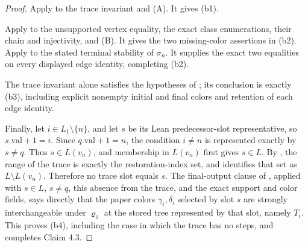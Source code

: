\begin{proof}
Apply  to the trace invariant and
(A).  It gives (b1).

Apply  to the unsupported
vertex equality, the exact class enumerations, their chain and
injectivity, and (B).  It gives the two missing-color assertions in
(b2).  Apply  to the stated
terminal stability of \(\sigma_n\).  It supplies the exact two
equalities on every displayed edge identity, completing (b2).

The trace invariant alone satisfies the hypotheses of
; its conclusion is exactly
(b3), including explicit nonempty initial and final colors and retention
of each edge identity.

Finally, let \(i\in L_1\setminus\{n\}\), and let \(s\) be its Lean
predecessor-slot representative, so \(s.\mathrm{val}+1=i\).  Since
\(q.\mathrm{val}+1=n\), the condition \(i\ne n\) is represented exactly
by \(s\ne q\).  Thus \(s\in L(v_n)\), and membership in \(L(v_n)\)
first gives \(s\in L\).  By ,
the range of the trace is exactly the restoration-index set, and
 identifies that set as
\(L\setminus L(v_n)\).  Therefore no trace slot equals \(s\).  The
final-output clause of ,
applied with \(s\in L\), \(s\ne q\), this absence from the trace, and
the exact support and color fields, says directly that the paper colors
\(\gamma_i,\delta_i\) selected by slot \(s\) are strongly
interchangeable under \(\varrho_1\) at the stored tree represented by
that slot, namely \(T_i\).  This proves (b4), including the case in
which the trace has no steps, and completes Claim 4.3.
\end{proof}
